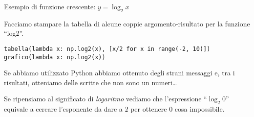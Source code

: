 \begin{esempio}
Esempio di funzione crescente: 
\(y=\log_{2}{x}\)

Facciamo stampare  la tabella di alcune coppie argomento-risultato per la 
funzione ``log2''.

\begin{lstlisting}
tabella(lambda x: np.log2(x), [x/2 for x in range(-2, 10)])
grafico(lambda x: np.log2(x))
\end{lstlisting}


\end{esempio}
Se abbiamo utilizzato Python abbiamo ottenuto degli strani messaggi e, 
tra i risultati, otteniamo delle scritte che non sono un numeri\dots 

Se ripensiamo al significato di \emph{logaritmo} vediamo che l'espressione 
``\(\log_2{0}\)'' equivale a cercare l'esponente da dare a \(2\) per 
ottenere \(0\) cosa impossibile. 

